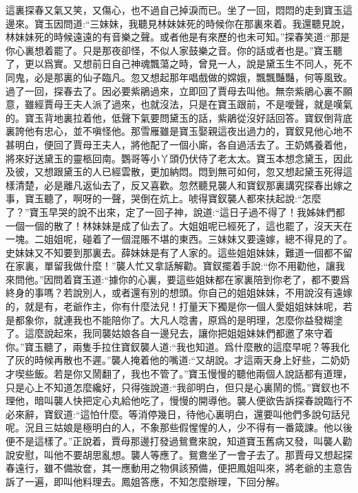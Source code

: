 \begin{parag}
    這裏探春又氣又笑，又傷心，也不過自己掉淚而已。坐了一回，悶悶的走到寶玉這邊來。寶玉因問道:“三妹妹，我聽見林妹妹死的時候你在那裏來着。我還聽見說，林妹妹死的時候遠遠的有音樂之聲。或者他是有來歷的也未可知。”探春笑道:“那是你心裏想着罷了。只是那夜卻怪，不似人家鼓樂之音。你的話或者也是。”寶玉聽了，更以爲實。又想前日自己神魂飄蕩之時，曾見一人，說是黛玉生不同人，死不同鬼，必是那裏的仙子臨凡。忽又想起那年唱戲做的嫦娥，飄飄豔豔，何等風致。過了一回，探春去了。因必要紫鵑過來，立即回了賈母去叫他。無奈紫鵑心裏不願意，雖經賈母王夫人派了過來，也就沒法，只是在寶玉跟前，不是噯聲，就是嘆氣的。寶玉背地裏拉着他，低聲下氣要問黛玉的話，紫鵑從沒好話回答。寶釵倒背底裏誇他有忠心，並不嗔怪他。那雪雁雖是寶玉娶親這夜出過力的，寶釵見他心地不甚明白，便回了賈母王夫人，將他配了一個小廝，各自過活去了。王奶媽養着他，將來好送黛玉的靈柩回南。鸚哥等小丫頭仍伏侍了老太太。寶玉本想念黛玉，因此及彼，又想跟黛玉的人已經雲散，更加納悶。悶到無可如何，忽又想起黛玉死得這樣清楚，必是離凡返仙去了，反又喜歡。忽然聽見襲人和寶釵那裏講究探春出嫁之事，寶玉聽了，啊呀的一聲，哭倒在炕上。唬得寶釵襲人都來扶起說:“怎麼了？”寶玉早哭的說不出來，定了一回子神，說道:“這日子過不得了！我姊妹們都一個一個的散了！林妹妹是成了仙去了。大姐姐呢已經死了，這也罷了，沒天天在一塊。二姐姐呢，碰着了一個混賬不堪的東西。三妹妹又要遠嫁，總不得見的了。史妹妹又不知要到那裏去。薛妹妹是有了人家的。這些姐姐妹妹，難道一個都不留在家裏，單留我做什麼！”襲人忙又拿話解勸。寶釵擺着手說:“你不用勸他，讓我來問他。”因問着寶玉道:“據你的心裏，要這些姐妹都在家裏陪到你老了，都不要爲終身的事嗎？若說別人，或者還有別的想頭。你自己的姐姐妹妹，不用說沒有遠嫁的，就是有，老爺作主，你有什麼法兒！打量天下獨是你一個人愛姐姐妹妹呢，若是都象你，就連我也不能陪你了。大凡人唸書，原爲的是明理，怎麼你益發糊塗了。這麼說起來，我同襲姑娘各自一邊兒去，讓你把姐姐妹妹們都邀了來守着你。”寶玉聽了，兩隻手拉住寶釵襲人道:“我也知道。爲什麼散的這麼早呢？等我化了灰的時候再散也不遲。”襲人掩着他的嘴道:“又胡說。才這兩天身上好些，二奶奶才喫些飯。若是你又鬧翻了，我也不管了。”寶玉慢慢的聽他兩個人說話都有道理，只是心上不知道怎麼纔好，只得強說道:“我卻明白，但只是心裏鬧的慌。”寶釵也不理他，暗叫襲人快把定心丸給他吃了，慢慢的開導他。襲人便欲告訴探春說臨行不必來辭，寶釵道:“這怕什麼。等消停幾日，待他心裏明白，還要叫他們多說句話兒呢。況且三姑娘是極明白的人，不象那些假惺惺的人，少不得有一番箴諫。他以後便不是這樣了。”正說着，賈母那邊打發過鴛鴦來說，知道寶玉舊病又發，叫襲人勸說安慰，叫他不要胡思亂想。襲人等應了。鴛鴦坐了一會子去了。那賈母又想起探春遠行，雖不備妝奩，其一應動用之物俱該預備，便把鳳姐叫來，將老爺的主意告訴了一遍，即叫他料理去。鳳姐答應，不知怎麼辦理，下回分解。
\end{parag}